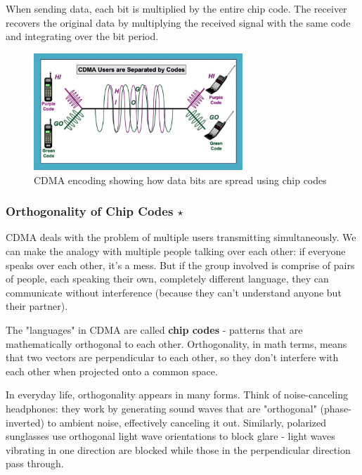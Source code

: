 When sending data, each bit is multiplied by the entire chip code. The receiver recovers the original data by multiplying the received signal with the same code and integrating over the bit period.


\begin{figure}[h]
    \centering
    \includegraphics[width=0.7\textwidth]{assets/osi/physical/multiplexing/cdma_example.png}
    \caption{CDMA encoding showing how data bits are spread using chip codes}
    \label{fig:cdma_example}
\end{figure}


\subsubsection{Orthogonality of Chip Codes $\star$}

CDMA deals with the problem of multiple users transmitting simultaneously. We can make the analogy with multiple people talking over each other: if everyone speaks over each other, it's a mess. But if the group involved is comprise of pairs of people, each speaking their own, completely different language, they can communicate without interference (because they can't understand anyone but their partner). 

The "languages" in CDMA are called \textbf{chip codes} - patterns that are mathematically orthogonal to each other. Orthogonality, in math terms, means that two vectors are perpendicular to each other, so they don't interfere with each other when projected onto a common space.

In everyday life, orthogonality appears in many forms. Think of noise-canceling headphones: they work by generating sound waves that are "orthogonal" (phase-inverted) to ambient noise, effectively canceling it out. Similarly, polarized sunglasses use orthogonal light wave orientations to block glare - light waves vibrating in one direction are blocked while those in the perpendicular direction pass through.


